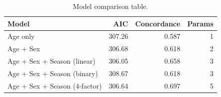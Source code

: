 \begin{table}[t]
    \centering
    \captionsetup{font=scriptsize}
    \caption{Model comparison table.}
    \label{table:models}
    \scriptsize
    \begin{tabular}{lrrr}
        \toprule
        Model                         & AIC    & Concordance & Params \\
        \midrule
        Age only                      & 307.26 & 0.587       & 1      \\
        Age + Sex                     & 306.68 & 0.618       & 2      \\
        Age + Sex + Season (linear)   & 306.05 & 0.658       & 3      \\
        Age + Sex + Season (binary)   & 308.67 & 0.618       & 3      \\
        Age + Sex + Season (4-factor) & 306.64 & 0.697       & 5      \\
        \bottomrule
    \end{tabular}
\end{table}